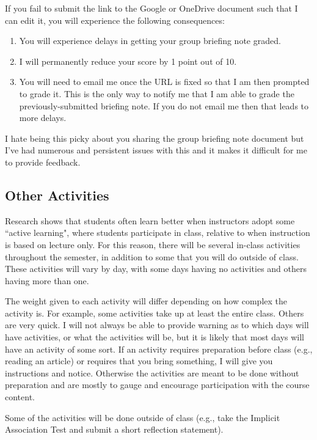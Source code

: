 \documentclass[11pt,letterpaper,final]{article}
\begin{document}
If you fail to submit the link to the Google or OneDrive document such that I can edit it, you will experience the following consequences:
\begin{enumerate}
\item You will experience delays in getting your group briefing note graded.
\item I will permanently reduce your score by 1 point out of 10. 
\item You will need to email me once the URL is fixed so that I am then prompted to grade it. This is the only way to notify me that I am able to grade the previously-submitted briefing note. If you do not email me then that leads to more delays. 
\end{enumerate}

I hate being this picky about you sharing the group briefing note document but I've had numerous and persistent issues with this and it makes it difficult for me to provide feedback.

\subsection{Other Activities}
Research shows that students often learn better when instructors adopt some ``active learning", where students participate in class, relative to when instruction is based on lecture only. For this reason, there will be several in-class activities throughout the semester, in addition to some that you will do outside of class. These activities will vary by day, with some days having no activities and others having more than one.

The weight given to each activity will differ depending on how complex the activity is. For example, some activities take up at least the entire class. Others are very quick. I will not always be able to provide warning as to which days will have activities, or what the activities will be, but it is likely that most days will have an activity of some sort. If an activity requires preparation before class (e.g., reading an article) or requires that you bring something, I will give you instructions and notice. Otherwise the activities are meant to be done without preparation and are mostly to gauge and encourage participation with the course content.

Some of the activities will be done outside of class (e.g., take the Implicit Association Test and submit a short reflection statement).
\end{document}
